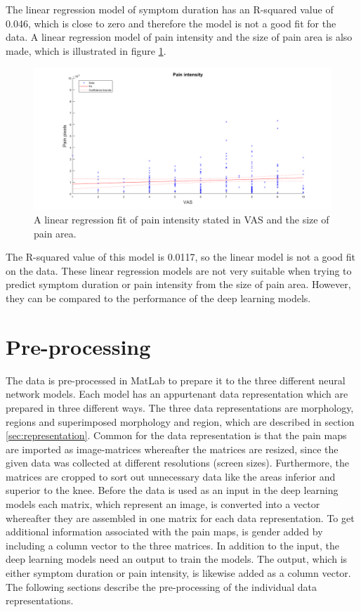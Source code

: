 \noindent
The linear regression model of symptom duration has an R-squared value of 0.046, which is close to zero and therefore the model is not a good fit for the data. 
A linear regression model of pain intensity and the size of pain area is also made, which is illustrated in figure \ref{fig:painRegression}.

\begin{figure} [H]
\centering
\includegraphics[width=1\textwidth]{figures/painRegression}
\caption{A linear regression fit of pain intensity stated in VAS and the size of pain area.}
\label{fig:painRegression}
\end{figure}

\noindent
The R-squared value of this model is 0.0117, so the linear model is not a good fit on the data. 
These linear regression models are not very suitable when trying to predict symptom duration or pain intensity from the size of pain area. However, they can be compared to the performance of the deep learning models.  


\section{Pre-processing}
The data is pre-processed in MatLab to prepare it to the three different neural network models. Each model has an appurtenant data representation which are prepared in three different ways. The three data representations are morphology, regions and superimposed morphology and region, which are described in section \ref{sec:representation}. Common for the data representation is that the pain maps are imported as image-matrices whereafter the matrices are resized, since the given data was collected at different resolutions (screen sizes). Furthermore, the matrices are cropped to sort out unnecessary data like the areas inferior and superior to the knee.
Before the data is used as an input in the deep learning models each matrix, which represent an image, is converted into a vector whereafter they are assembled in one matrix for each data representation. To get additional information associated with the pain maps, is gender added by including a column vector to the three matrices. 
In addition to the input, the deep learning models need an output to train the models. The output, which is either symptom duration or pain intensity, is likewise added as a column vector. 
The following sections describe the pre-processing of the individual data representations. 

